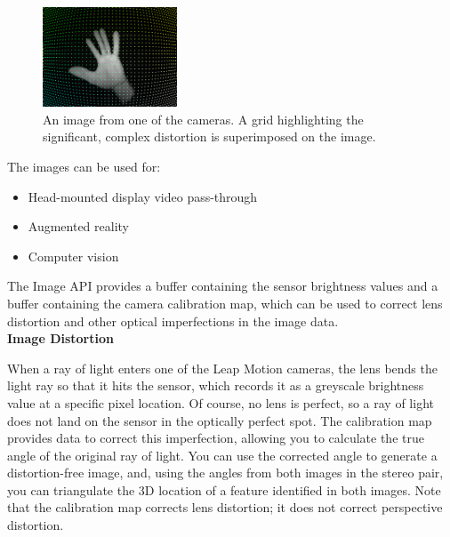 \documentclass[journal]{IEEEtran}										    %
\begin{document}
                \begin{figure}[h]
                    \centering
                    \includegraphics[width=4cm]{Leap-Image-Raw}
                    \caption{An image from one of the cameras. A grid highlighting 
                    the significant, complex distortion is superimposed on the image. \cite{TAG12}}
                    \label{fig:leapCam1}
                \end{figure}
                The images can be used for:
                \begin{itemize}
                    \item Head-mounted display video pass-through
                    \item Augmented reality
                    \item Computer vision 
                \end{itemize} 
                The Image API provides a buffer containing the sensor brightness
                values and a buffer containing the camera calibration map, 
                which can be used to correct lens distortion and other optical 
                imperfections in the image data.  \\

                \textbf{Image Distortion}

                When a ray of light enters one of the Leap Motion cameras, the 
                lens bends the light ray so that it hits the sensor, which records 
                it as a greyscale brightness value at a specific pixel location. 
                Of course, no lens is perfect, so a ray of light does not land 
                on the sensor in the optically perfect spot. The calibration 
                map provides data to correct this imperfection, allowing you to 
                calculate the true angle of the original ray of light. You can 
                use the corrected angle to generate a distortion-free image, and, 
                using the angles from both images in the stereo pair, you can 
                triangulate the 3D location of a feature identified in both images. 
                Note that the calibration map corrects lens distortion; it does 
                not correct perspective distortion.
\end{document}
